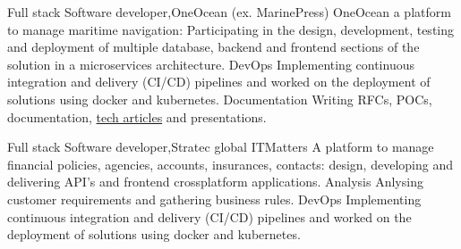     \resumeSubheading
    {Full stack Software developer,}{OneOcean (ex. MarinePress)}{}
    {}
      \resumeItemListStart
      \renewcommand{\labelitemii}{\raisebox{.4cm}{$\bullet$}}
        \resumeItem
        {OneOcean} {a platform to manage maritime navigation: Participating in the design, development, testing and deployment of multiple database, backend and frontend 
        sections of the solution in a microservices architecture.}
        \renewcommand{\labelitemii}{\raisebox{.2cm}{$\bullet$}}
        \resumeItem
        {DevOps} {Implementing continuous integration and delivery (CI/CD) pipelines and worked on the deployment of solutions using 
        docker and kubernetes.}
        \renewcommand{\labelitemii}{\raisebox{0cm}{$\bullet$}}
        \resumeItem
        {Documentation} {Writing RFCs, POCs, documentation, \href{https://medium.com/oneoceangroup/publishing-and-consuming-debugging-symbols-for-net-core-library-d0e831f5862}{tech articles} and presentations.}
        \renewcommand{\labelitemii}{\scriptsize \raisebox{.25cm}{\ding{118}}}
      \resumeItemListEnd

    \resumeSubheading
    {Full stack Software developer,}{Stratec global}{}
    {}
      \resumeItemListStart
      \renewcommand{\labelitemii}{\raisebox{0cm}{$\bullet$}}
        \resumeItem
         {ITMatters} {A platform to manage financial policies, agencies, accounts, insurances, contacts: design, developing and delivering API's and frontend crossplatform applications.}
         \renewcommand{\labelitemii}{\raisebox{0cm}{$\bullet$}}
         \resumeItem
         {Analysis} {Anlysing customer requirements and gathering business rules.}
         \renewcommand{\labelitemii}{\raisebox{.2cm}{$\bullet$}}
         \resumeItem
         {DevOps} {Implementing continuous integration and delivery (CI/CD) pipelines and worked on the deployment of solutions using 
         docker and kubernetes.}
        \renewcommand{\labelitemii}{\scriptsize \raisebox{.25cm}{\ding{118}}}
      \resumeItemListEnd
    
